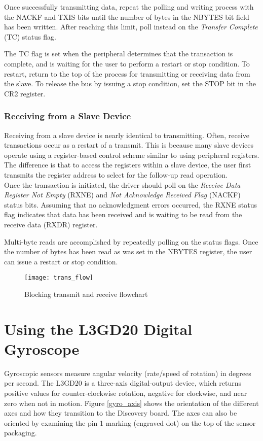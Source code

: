 \documentclass[openany,11pt,fleqn]{book} %
\begin{document}
        Once successfully transmitting data, repeat the polling and writing process with the NACKF and TXIS bits until the number of bytes in the NBYTES bit field has been written. After reaching this limit, poll instead on the \textit{Transfer Complete} (TC) status flag. 
        
        The TC flag is set when the peripheral determines that the transaction is complete, and is waiting for the user to perform a restart or stop condition. To restart, return to the top of the process for transmitting or receiving data from the slave. To release the bus by issuing a stop condition, set the STOP bit in the CR2 register.  
    
    \subsubsection{Receiving from a Slave Device}
        Receiving from a slave device is nearly identical to transmitting. Often, receive transactions occur as a restart of a transmit. This is because many slave devices operate using a register-based control scheme similar to using peripheral registers. The difference is that to access the registers within a slave device, the user first transmits the register address to select for the follow-up read operation. \\
        
        Once the transaction is initiated, the driver should poll on the \textit{Receive Data Register Not Empty} (RXNE) and \textit{Not Acknowledge Received Flag} (NACKF) status bits. Assuming that no acknowledgment errors occurred, the RXNE status flag indicates that data has been received and is waiting to be read from the receive data (RXDR) register.  
        
        Multi-byte reads are accomplished by repeatedly polling on the status flags. Once the number of bytes has been read as was set in the NBYTES register, the user can issue a restart or stop condition.  
    
    \begin{figure}[]
       \centering\texttt{[image: trans\_flow]}
       \caption{Blocking transmit and receive flowchart}
       \label{trans_flow}
    \end{figure}

\section{Using the L3GD20 Digital Gyroscope}
Gyroscopic sensors measure angular velocity (rate/speed of rotation) in degrees per second. The L3GD20 is a three-axis digital-output device, which returns positive values for counter-clockwise rotation, negative for clockwise, and near zero when not in motion. Figure \ref{gyro_axis} shows the orientation of the different axes and how they transition to the Discovery board. The axes can also be oriented by examining the pin 1 marking (engraved dot) on the top of the sensor packaging.  
\end{document}
